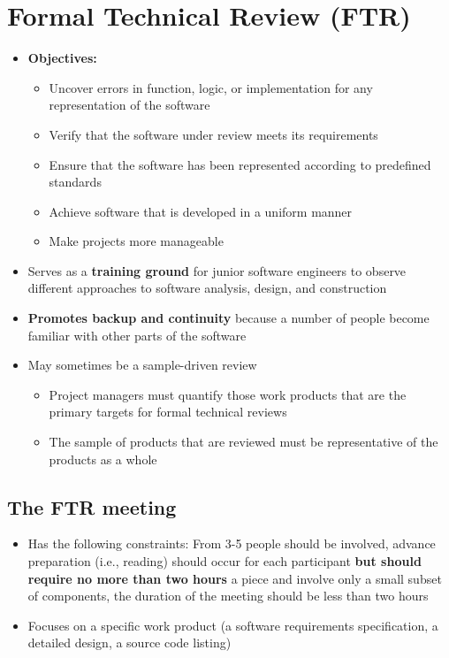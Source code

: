 \documentclass{article}
\begin{document}
\section{Formal Technical Review (FTR)}

\begin{itemize}
  \item \textbf{Objectives:}
  \begin{itemize}
    \item Uncover errors in function, logic, or implementation for any representation of the software
    \item Verify that the software under review meets its requirements
    \item Ensure that the software has been represented according to predefined standards
    \item Achieve software that is developed in a uniform manner
    \item Make projects more manageable
  \end{itemize}
  \item Serves as a \textbf{training ground} for junior software engineers to observe different approaches to software analysis, design, and construction 
  \item \textbf{Promotes backup and continuity} because a number of people become familiar with other parts of the software
  \item May sometimes be a sample-driven review
  \begin{itemize}
    \item Project managers must quantify those work products that are the primary targets for formal technical reviews
    \item The sample of products that are reviewed must be representative of the products as a whole
  \end{itemize}
\end{itemize}

\subsection{The FTR meeting}

\begin{itemize}
  \item Has the following constraints: From 3-5 people should be involved, advance preparation (i.e., reading) should occur for each participant \textbf{but should require no more than two hours} a piece and involve only a small subset of components, the duration of the meeting should be less than two hours
  \item Focuses on a specific work product (a software requirements specification, a detailed design, a source code listing)
\end{itemize}
\end{document}
